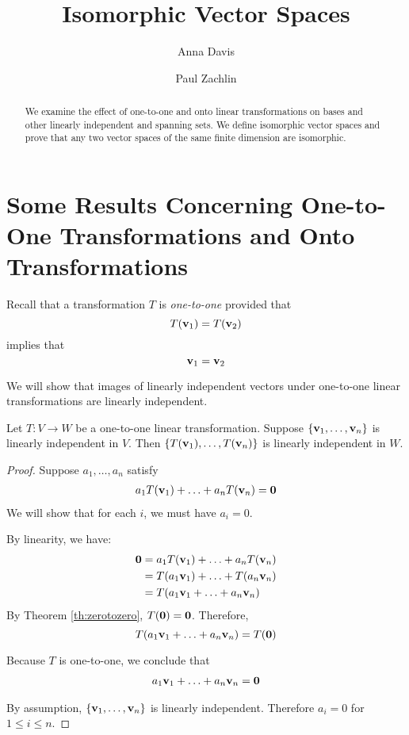 \documentclass{ximera}
\author{Anna Davis \and Paul Zachlin} \title{Isomorphic Vector Spaces} \license{CC-BY 4.0}
\renewcommand{\vec}[1]{{\bf #1}}
\newcommand{\dfn}{\textit}
\begin{document}
\begin{abstract}
  We examine the effect of one-to-one and onto linear transformations on bases and other linearly independent and spanning sets.  We define isomorphic vector spaces and prove that any two vector spaces of the same finite dimension are isomorphic.
\end{abstract}
\maketitle



\section*{Some Results Concerning One-to-One Transformations and Onto Transformations}

Recall that a transformation $T$ is \dfn{one-to-one} provided that $$T(\vec{v}_1)=T(\vec{v}_2)$$ implies that $$\vec{v}_1=\vec{v}_2$$

 We will show that images of linearly independent vectors under one-to-one linear transformations are linearly independent.  

\begin{theorem}\label{th:onetoonelinind} Let $T:V\rightarrow W$ be a one-to-one linear transformation.  Suppose $\{\vec{v}_1,\ldots,\vec{v}_n\}$ is linearly independent in $V$.  Then $\{T(\vec{v}_1),\ldots,T(\vec{v}_n)\}$ is linearly independent in $W$.
\end{theorem}

\begin{proof}
Suppose $a_1, \ldots, a_n$ satisfy
\begin{align}\label{onlysolution}a_1T(\vec{v}_1)+\ldots +a_nT(\vec{v}_n)=\vec{0}\end{align}
We will show that for each $i$, we must have $a_i=0$.

By linearity, we have:
\begin{align*}\vec{0}&=a_1T(\vec{v}_1)+\ldots +a_nT(\vec{v}_n)\\
&=T(a_1\vec{v}_1)+\ldots +T(a_n\vec{v}_n)\\
&=T(a_1\vec{v}_1+\ldots +a_n\vec{v}_n)
\end{align*}
By Theorem \ref{th:zerotozero}, $T(\vec{0})=\vec{0}$.  Therefore,
$$T(a_1\vec{v}_1+\ldots +a_n\vec{v}_n)=T(\vec{0})$$

Because $T$ is one-to-one, we conclude that 
\begin{align}\label{onlytrivial}a_1\vec{v}_1+\ldots +a_n\vec{v}_n=\vec{0}\end{align}


By assumption, $\{\vec{v}_1,\ldots,\vec{v}_n\}$ is linearly independent.  Therefore $a_i=0$ for $1\leq i\leq n$.  
\end{proof}
\end{document}
